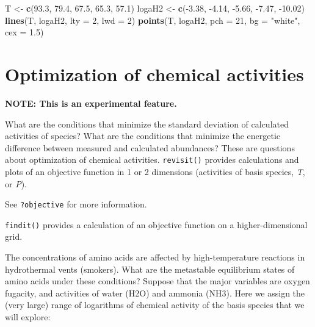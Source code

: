\documentclass[]{tufte-handout}
\newenvironment{Shaded}{}{}
\newcommand{\KeywordTok}[1]{\textcolor[rgb]{0.00,0.44,0.13}{\textbf{#1}}}
\newcommand{\DataTypeTok}[1]{\textcolor[rgb]{0.56,0.13,0.00}{#1}}
\newcommand{\DecValTok}[1]{\textcolor[rgb]{0.25,0.63,0.44}{#1}}
\newcommand{\FloatTok}[1]{\textcolor[rgb]{0.25,0.63,0.44}{#1}}
\newcommand{\StringTok}[1]{\textcolor[rgb]{0.25,0.44,0.63}{#1}}
\newcommand{\OperatorTok}[1]{\textcolor[rgb]{0.40,0.40,0.40}{#1}}
\newcommand{\NormalTok}[1]{#1}
\begin{document}
\begin{Shaded}
\begin{Highlighting}[]
\NormalTok{T <-}\StringTok{ }\KeywordTok{c}\NormalTok{(}\FloatTok{93.3}\NormalTok{, }\FloatTok{79.4}\NormalTok{, }\FloatTok{67.5}\NormalTok{, }\FloatTok{65.3}\NormalTok{, }\FloatTok{57.1}\NormalTok{)}
\NormalTok{logaH2 <-}\StringTok{ }\KeywordTok{c}\NormalTok{(}\OperatorTok{-}\FloatTok{3.38}\NormalTok{, }\OperatorTok{-}\FloatTok{4.14}\NormalTok{, }\OperatorTok{-}\FloatTok{5.66}\NormalTok{, }\OperatorTok{-}\FloatTok{7.47}\NormalTok{, }\OperatorTok{-}\FloatTok{10.02}\NormalTok{)}
\KeywordTok{lines}\NormalTok{(T, logaH2, }\DataTypeTok{lty =} \DecValTok{2}\NormalTok{, }\DataTypeTok{lwd =} \DecValTok{2}\NormalTok{)}
\KeywordTok{points}\NormalTok{(T, logaH2, }\DataTypeTok{pch =} \DecValTok{21}\NormalTok{, }\DataTypeTok{bg =} \StringTok{"white"}\NormalTok{, }\DataTypeTok{cex =} \FloatTok{1.5}\NormalTok{)}
\end{Highlighting}
\end{Shaded}

\hypertarget{optimization-of-chemical-activities}{\section{Optimization
of chemical activities}\label{optimization-of-chemical-activities}}

\textbf{NOTE: This is an experimental feature.}

What are the conditions that minimize the standard deviation of
calculated activities of species? What are the conditions that minimize
the energetic difference between measured and calculated abundances?
These are questions about optimization of chemical activities.
{\texttt{revisit()}} provides calculations and plots of an objective
function in 1 or 2 dimensions (activities of basis species, \emph{T}, or
\emph{P}).

\begin{marginfigure}
See {\texttt{?objective}} for more information.
\end{marginfigure}

{\texttt{findit()}} provides a calculation of an objective function on a
higher-dimensional grid.

The concentrations of amino acids are affected by high-temperature
reactions in hydrothermal vents (smokers). What are the metastable
equilibrium states of amino acids under these conditions? Suppose that
the major variables are oxygen fugacity, and activities of water (H2O)
and ammonia (NH3). Here we assign the (very large) range of logarithms
of chemical activity of the basis species that we will explore:
\end{document}
